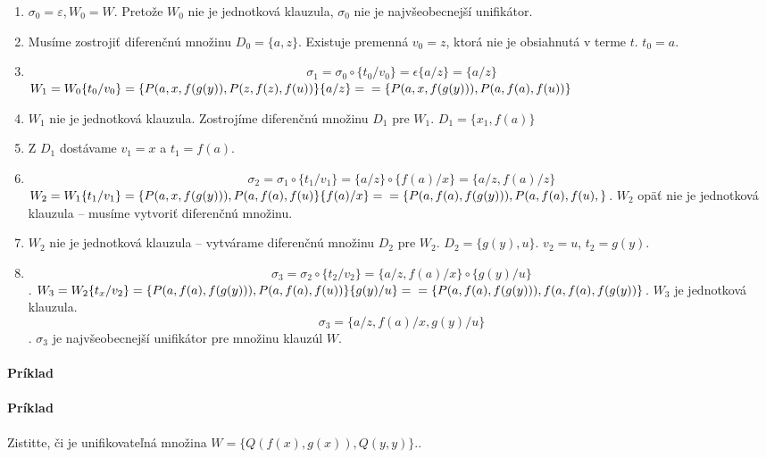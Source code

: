 \begin{enumerate}
	\item $\sigma_0 = \varepsilon, W_0 = W$. Pretože $W_0$ nie je jednotková
	klauzula, $\sigma_0$ nie je najvšeobecnejší unifikátor.
	\item Musíme zostrojiť diferenčnú množinu $D_0 = \{a, z\}$. Existuje
	premenná $v_0 = z$, ktorá nie je obsiahnutá v terme $t$. $t_0 = a$.
	\item $$\sigma_1 = \sigma_0 \circ \{ t_0/v_0 \} = \epsilon \{a/z\} =
	\{a/z\}$$ $W_1 = W_0\{ t_0/v_0 \} = \{P(a,x,f(g(y)),
	P(z,f(z),f(u))\}\{a/z\} =  \\
	= \{P(a,x,f(g(y))), P(a, f(a), f(u))\}$

	\item $W_1$ nie je jednotková klauzula. Zostrojíme diferenčnú množinu
	$D_1$ pre $W_1$. $D_1 = \{x_1, f(a)\}$

	\item Z $D_1$ dostávame $v_1 = x$ a $t_1 = f(a)$.
	\item $$\sigma_2 = \sigma_1 \circ \{ t_1/v_1\}= \{a/z\} \circ \{ f(a)/x\}
	= \{a/z, f(a)/z \}$$
	$ W_2 = W_1 \{t_1/v_1\} = \{P(a,x,f(g(y))), P(a,f(a),f(u)\} \{ f(a)/x
	\} = \\
	= \{ P(a,f(a), f(g(y))), P(a,f(a), f(u), \}$. $W_2$ opäť nie je
	jednotková klauzula -- musíme vytvoriť diferenčnú množinu.

	\item $W_2$ nie je jednotková klauzula -- vytvárame diferenčnú množinu
	$D_2$ pre $W_2$. $D_2 = \{ g(y), u \}$. $v_2 = u$, $t_2 = g(y)$.

	\item $$\sigma_3 = \sigma_2 \circ \{t_2/v_2\} = \{a/z, f(a)/x\} \circ
	\{g(y)/u\}$$.
	$W_3 = W_2 \{ t_x/v_2\} = \{ P(a,f(a), f(g(y))), P(a,f(a),
	f(u))\}\{g(y)/u\} = \\
	= \{ P(a, f(a), f(g(y))), f(a, f(a), f(g(y)) \}$.
	$W_3$ je jednotková klauzula.
	$$ \sigma_3 = \{ a/z, f(a)/x, g(y)/u\}$$. $\sigma_3$ je najvšeobecnejší
	unifikátor pre množinu klauzúl $W$.
\end{enumerate}

\paragraph{Príklad}

\paragraph{Príklad} Zistitte, či je unifikovateľná množina $W=\{Q(f(x),g(x)),
Q(y,y)\}..$


